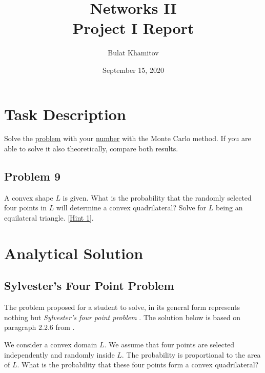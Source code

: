 \documentclass{article}
\title{Networks II \\ Project I Report}
\author{Bulat Khamitov}
\date{September 15, 2020}
\begin{document}
\maketitle

\tableofcontents

\section{Task Description}

Solve the \href{http://vladowiki.fmf.uni-lj.si/doku.php?id=ru:hse:snet:problems}{problem} with your \href{http://vladowiki.fmf.uni-lj.si/doku.php?id=ru:hse:snet19:students}{number} with the Monte Carlo method. 
If you are able to solve it also theoretically, compare both results.

\subsection*{Problem 9}

A convex shape $L$ is given.
What is the probability that the randomly selected four points in $L$ will determine a convex quadrilateral? 
Solve for $L$ being an equilateral triangle. 
\href{http://vladowiki.fmf.uni-lj.si/doku.php?id=ru:hse:snet:problems#hint_1}{[Hint 1]}.

\newpage

\section{Analytical Solution}

\subsection{Sylvester's Four Point Problem}

The problem proposed for a student to solve, in its general form represents nothing but \textit{Sylvester's four point problem} \cite{sylvester}.
The solution below is based on paragraph 2.2.6 from \cite{geom}.

We consider a convex domain $L$.
We assume that four points are selected independently and randomly inside $L$.
The probability is proportional to the area of $L$.
What is the probability that these four points form a convex quadrilateral?
\end{document}
